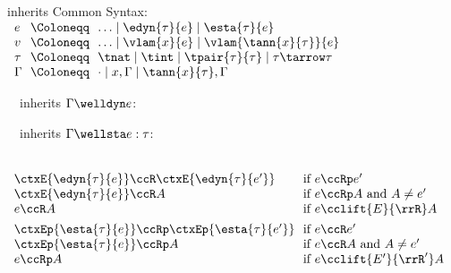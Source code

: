 \begin{flushleft}

 inherits Common Syntax:\\
$\begin{array}{l@{~~}c@{~~}l}
  e & \Coloneqq & \ldots \mid \edyn{\tau}{e} \mid \esta{\tau}{e}
\\
  v & \Coloneqq & \ldots \mid \vlam{x}{e} \mid \vlam{\tann{x}{\tau}}{e}
\\
  \tau & \Coloneqq & \tnat \mid \tint \mid \tpair{\tau}{\tau} \mid \tau \tarrow \tau
\\
  \Gamma & \Coloneqq & \cdot \mid x,\Gamma \mid \tann{x}{\tau},\Gamma
\end{array}$

\medskip
\begin{minipage}[t]{0.5\columnwidth}
~~inherits $\Gamma \welldyn e$:\\
\begin{mathpar}
\end{mathpar}
\end{minipage}%
\begin{minipage}[t]{0.5\columnwidth}
~~inherits $\Gamma \wellsta e : \tau$:\\
\begin{mathpar}

\end{mathpar}
\end{minipage}

\medskip
{}\\
$\begin{array}{l@{~~}l}
\ctxE{\edyn{\tau}{e}} \ccR \ctxE{\edyn{\tau}{e'}} & \mbox{if $e \ccRp e'$}
\\
\ctxE{\edyn{\tau}{e}} \ccR A & \mbox{if $e \ccRp A$ and $A \neq e'$}
\\
e \ccR A & \mbox{if $e \cclift{E}{\rrR} A$}
\\[1ex]
\ctxEp{\esta{\tau}{e}} \ccRp \ctxEp{\esta{\tau}{e'}} & \mbox{if $e \ccR e'$}
\\
\ctxEp{\esta{\tau}{e}} \ccRp A & \mbox{if $e \ccR A$ and $A \neq e'$}
\\
e \ccRp A & \mbox{if $e \cclift{E'}{\rrR'} A$}
\end{array}$

\end{flushleft}
